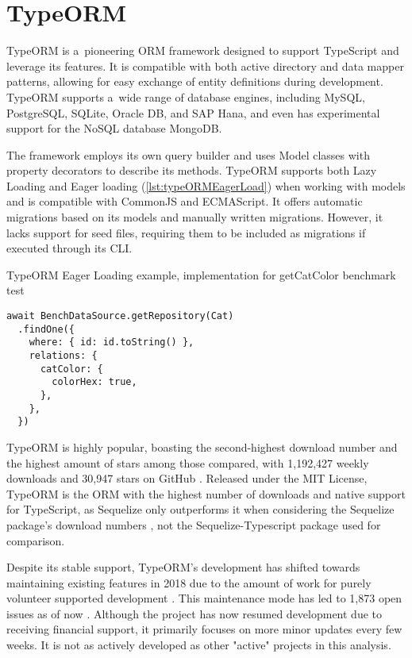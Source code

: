 \section{TypeORM}

TypeORM is a~pioneering ORM framework designed to support TypeScript and
leverage its features. It is compatible with both active directory and data
mapper patterns, allowing for easy exchange of entity definitions during
development. TypeORM supports a~wide range of database engines, including MySQL,
PostgreSQL, SQLite, Oracle DB, and SAP Hana, and even has experimental support
for the NoSQL database MongoDB.

The framework employs its own query builder and uses Model classes with property
decorators to describe its methods. TypeORM supports both Lazy Loading and Eager
loading (\autoref{lst:typeORMEagerLoad}) when working with models and is compatible
with CommonJS and ECMAScript. It offers automatic migrations based on its models
and manually written migrations. However, it lacks support for seed files,
requiring them to be included as migrations if executed through its CLI.

\begin{listing}[hb]
  \caption{TypeORM Eager Loading example, implementation for getCatColor benchmark test}
  \label{lst:typeORMEagerLoad}
  \begin{verbatim}
await BenchDataSource.getRepository(Cat)
  .findOne({
    where: { id: id.toString() },
    relations: {
      catColor: {
        colorHex: true,
      },
    },
  })
  \end{verbatim}
\end{listing}

TypeORM is highly popular, boasting the second-highest download number and the
highest amount of stars among those compared, with 1,192,427 weekly downloads
\cite{typeORMNpm} and 30,947 stars on GitHub \cite{typeORMGitHub}. Released
under the MIT License, TypeORM is the ORM with the highest number of downloads
and native support for TypeScript, as Sequelize only outperforms it when
considering the Sequelize package's download numbers
\cite{sequelizeNpm}, not the Sequelize-Typescript package
\cite{sequelizeTypescriptNpm} used for comparison.

Despite its stable support, TypeORM's development has shifted towards
maintaining existing features in 2018 due to the amount of work for purely
volunteer supported development \cite{typeORMGitHubFuture}. This maintenance
mode has led to 1,873 open issues as of now \cite{typeORMGitHub}. Although the
project has now resumed development due to receiving financial support, it
primarily focuses on more minor updates every few weeks. It is not as actively
developed as other "active" projects in this analysis.

